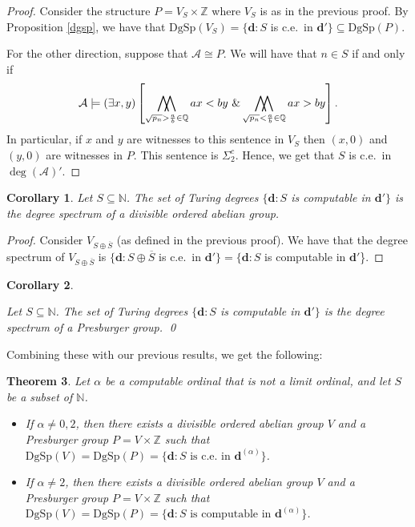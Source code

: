 \documentclass{amsart}%
\newtheorem{theorem}{Theorem}
\numberwithin{theorem}{section}
\newtheorem{corollary}[theorem]{Corollary}
\newcommand{\Q}{\mathbb{Q}}
\newcommand{\Z}{\mathbb{Z}}
\newcommand{\N}{\mathbb{N}}
\newcommand{\A}{\mathcal{A}}
\newcommand{\0}{\emptyset}
\newcommand{\ddd}{\boldsymbol{d}}
\DeclareMathOperator*{\WW}{\bigwedge\mkern-12mu\bigwedge}
\newcommand{\E}{\exists}
\newcommand{\dgsp}{\text{DgSp}}
\begin{document}
\begin{proof}
    Consider the structure $P= V_S\times \Z$ where $V_S$ is as in the previous proof. By Proposition \ref{dgsp}, we have that $\dgsp(V_S)=\{\ddd: S$ is c.e.\ in $\ddd'\}\subseteq \dgsp(P)$. 

    For the other direction, suppose that $\A\cong P$. We will have that $n\in S$ if and only if $$\A\models (\E x,y)\left[\WW_{\sqrt{p_n}>\frac{a}{b}\in \Q} ax<by \,\,\& \WW_{\sqrt{p_n}<\frac{a}{b}\in \Q} ax>by \right].$$ In particular, if $x$ and $y$ are witnesses to this sentence in $V_S$ then $(x,0)$ and $(y,0)$ are witnesses in $P$. This sentence is $\Sigma^c_2$. Hence, we get that $S$ is c.e.\ in $\deg(\A)'$. 
\end{proof}

\begin{corollary}
\label{degree cor 2}
Let $S\subseteq \N$. The set of Turing degrees $\{\ddd: S$ is computable in $\ddd'\}$ is the degree spectrum of a divisible ordered abelian group. 
\end{corollary}

\begin{proof}
Consider  $V_{S\oplus \overline{S}}$ (as defined in the previous proof). We have that the degree spectrum of $V_{S\oplus \overline{S}}$ is $\{\ddd:S\oplus \overline{S}$ is c.e.\ in $\ddd'\}=\{\ddd: S$ is computable in $\ddd'$\}. 
\end{proof}



\begin{corollary}
\label{degrees cor 3}



Let $S\subseteq \N$.  The set of Turing degrees $\{\ddd: S$ is computable in $\ddd'\}$ is the degree spectrum of a Presburger group. \qed

\end{corollary}


Combining these with our previous results, we get the following:

\begin{theorem}
\label{dgsp theorem}
    Let $\alpha$ be a computable ordinal that is not a limit ordinal, and let $S$ be a subset of $\N$. \begin{itemize}
        \item[(1)] If $\alpha \neq 0,2$, then there exists a  divisible ordered abelian group $V$ and a Presburger group $P=V\times \Z$ such that $\dgsp(V)=\dgsp(P)=\{\ddd:S \text{ is c.e.\ in } \ddd^{(\alpha)}\}$.
        \item[(2)] If $\alpha \neq 2$, then there exists a divisible ordered abelian group $V$ and a Presburger group $P=V\times \Z$ such that $\dgsp(V)=\dgsp(P)=\{\ddd:S \text{ is computable in } \ddd^{(\alpha)}\} $.
    \end{itemize}
\end{theorem}
\end{document}
